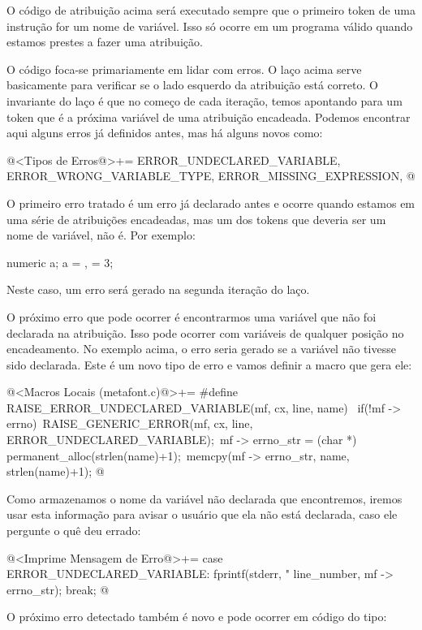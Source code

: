 O código de atribuição acima será executado sempre que o primeiro
token de uma instrução for um nome de variável. Isso só ocorre em um
programa válido quando estamos prestes a fazer uma atribuição.

O código foca-se primariamente em lidar com erros. O
laço  acima serve basicamente para verificar se
o lado esquerdo da atribuição está correto. O invariante do laço é que
no começo de cada iteração, temos  apontando para um
token que é a próxima variável de uma atribuição encadeada. Podemos
encontrar aqui alguns erros já definidos antes, mas há alguns novos
como:

\iniciocodigo
@<Tipos de Erros@>+=
ERROR_UNDECLARED_VARIABLE, ERROR_WRONG_VARIABLE_TYPE, ERROR_MISSING_EXPRESSION,
@
\fimcodigo

O primeiro erro tratado é um erro já declarado antes e ocorre quando
estamos em uma série de atribuições encadeadas, mas um dos tokens que
deveria ser um nome de variável, não é. Por exemplo:

\alinhaverbatim
numeric a;
a = , = 3; %
\alinhanormal

Neste caso, um erro será gerado na segunda iteração do laço.

O próximo erro que pode ocorrer é encontrarmos uma variável que não
foi declarada na atribuição. Isso pode ocorrer com variáveis de
qualquer posição no encadeamento. No exemplo acima, o erro seria
gerado se a variável  não tivesse sido declarada. Este é
um novo tipo de erro e vamos definir a macro que gera ele:

\iniciocodigo
@<Macros Locais (metafont.c)@>+=
#define RAISE_ERROR_UNDECLARED_VARIABLE(mf, cx, line, name) {\
  if(!mf -> errno){\
    RAISE_GENERIC_ERROR(mf, cx, line, ERROR_UNDECLARED_VARIABLE);\
    mf -> errno_str = (char *) permanent_alloc(strlen(name)+1);\
    memcpy(mf -> errno_str, name, strlen(name)+1);}}
@
\fimcodigo

Como armazenamos o nome da variável não declarada que encontremos,
iremos usar esta informação para avisar o usuário que ela não está
declarada, caso ele pergunte o quê deu errado:

\iniciocodigo
@<Imprime Mensagem de Erro@>+=
case ERROR_UNDECLARED_VARIABLE:
  fprintf(stderr, "%
          line_number, mf -> errno_str);
  break;
@
\fimcodigo

O próximo erro detectado também é novo e pode ocorrer em código do
tipo:

